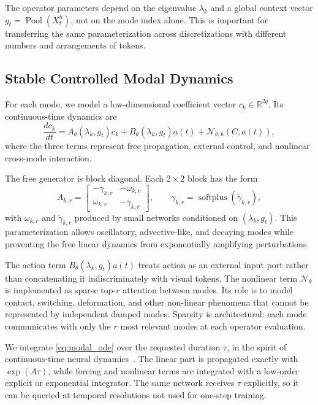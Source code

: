 \documentclass{article}
\theoremstyle{plain}
\theoremstyle{definition}
\theoremstyle{remark}
\newcommand{\R}{\mathbb{R}}
\newcommand{\pool}{\operatorname{Pool}}
\begin{document}
The operator parameters depend on the eigenvalue $\lambda_k$ and a global context vector $g_t=\pool(X_t^h)$, not on the mode index alone. This is important for transferring the same parameterization across discretizations with different numbers and arrangements of tokens.

\subsection{Stable Controlled Modal Dynamics}
For each mode, we model a low-dimensional coefficient vector $c_k\in\R^{2q}$. Its continuous-time dynamics are
\begin{equation}
\frac{dc_k}{dt}
=
A_{\theta}(\lambda_k,g_t)c_k
+
B_{\theta}(\lambda_k,g_t)a(t)
+
\mathcal{N}_{\theta,k}(C,a(t)),
\label{eq:modal_ode}
\end{equation}
where the three terms represent free propagation, external control, and nonlinear cross-mode interaction.

The free generator is block diagonal. Each $2\times2$ block has the form
\begin{equation}
    A_{k,r}
    =
    \begin{bmatrix}
        -\gamma_{k,r} & -\omega_{k,r} \\
        \omega_{k,r} & -\gamma_{k,r}
    \end{bmatrix},
    \qquad
    \gamma_{k,r}=\operatorname{softplus}(\widetilde{\gamma}_{k,r}),
    \label{eq:damped_rotation}
\end{equation}
with $\omega_{k,r}$ and $\widetilde{\gamma}_{k,r}$ produced by small networks conditioned on $(\lambda_k,g_t)$. This parameterization allows oscillatory, advective-like, and decaying modes while preventing the free linear dynamics from exponentially amplifying perturbations.

The action term $B_{\theta}(\lambda_k,g_t)a(t)$ treats action as an external input port rather than concatenating it indiscriminately with visual tokens. The nonlinear term $\mathcal{N}_{\theta}$ is implemented as sparse top-$r$ attention between modes. Its role is to model contact, switching, deformation, and other non-linear phenomena that cannot be represented by independent damped modes. Sparsity is architectural: each mode communicates with only the $r$ most relevant modes at each operator evaluation.

We integrate \cref{eq:modal_ode} over the requested duration $\tau$, in the spirit of continuous-time neural dynamics~\citep{chen2018neuralode}. The linear part is propagated exactly with $\exp(A\tau)$, while forcing and nonlinear terms are integrated with a low-order explicit or exponential integrator. The same network receives $\tau$ explicitly, so it can be queried at temporal resolutions not used for one-step training.
\end{document}
